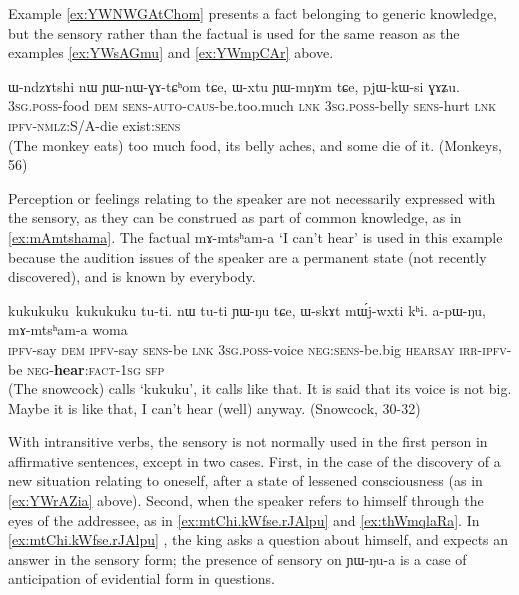 \documentclass[oldfontcommands,oneside,a4paper,11pt]{article}
\newcommand{\ipa}[1]{{\phon \mbox{#1}}} %
\begin{document}
Example \ref{ex:YWNWGAtChom} presents a fact belonging to generic knowledge, but the sensory rather than the factual is used for the same reason as the examples \ref{ex:YWsAGmu} and \ref{ex:YWmpCAr} above.

\begin{exe}
\ex \label{ex:YWNWGAtChom}
\gll
\ipa{ɯ-ndzɤtshi}  	\ipa{nɯ}  	\ipa{ɲɯ-nɯ-ɣɤ-tɕʰom}  	\ipa{tɕe,}  	\ipa{ɯ-xtu}  	\ipa{ɲɯ-mŋɤm}  	\ipa{tɕe,}  	\ipa{pjɯ-kɯ-si}  	\ipa{ɣɤʑu.}  \\
\textsc{3sg.poss}-food \textsc{dem} \textsc{sens-auto-caus}-be.too.much \textsc{lnk} \textsc{3sg.poss}-belly \textsc{sens}-hurt \textsc{lnk} \textsc{ipfv-nmlz}:S/A-die exist:\textsc{sens} \\
\glt (The monkey eats) too much food, its belly aches, and some die of it. (Monkeys, 56)
\end{exe}
  
Perception or feelings relating to the speaker are not necessarily expressed with the sensory, as they can be construed as part of common knowledge, as in \ref{ex:mAmtshama}. The factual  \ipa{mɤ-mtsʰam-a} `I can't hear' is used in this example because the audition issues of the speaker are a permanent state (not recently discovered), and is known by everybody.

\begin{exe}
\ex \label{ex:mAmtshama}
\gll
\ipa{kukukuku kukukuku} 	\ipa{tu-ti.} 	\ipa{nɯ} 	\ipa{tu-ti} 	\ipa{ɲɯ-ŋu} 	\ipa{tɕe,} 	\ipa{ɯ-skɤt} 	\ipa{mɯ́j-wxti} 	\ipa{kʰi.} 	\ipa{a-pɯ-ŋu,} \ipa{mɤ-mtsʰam-a} 	\ipa{woma} \\
{ } \textsc{ipfv}-say \textsc{dem}  \textsc{ipfv}-say \textsc{sens}-be \textsc{lnk}  \textsc{3sg.poss}-voice \textsc{neg:sens}-be.big \textsc{hearsay} \textsc{irr-ipfv}-be \textsc{neg}-\textbf{hear}:\textsc{fact-1sg} \textsc{sfp} \\
\glt (The snowcock) calls `kukuku', it calls like that. It is said that its voice is not big. Maybe it is like that, I can't hear (well) anyway. (Snowcock, 30-32)
\end{exe}

 With intransitive verbs, the sensory is not normally used in the first person in affirmative sentences, except in two cases. First, in the case of the discovery of a new situation relating to oneself, after a state of lessened consciousness (as in \ref{ex:YWrAZia} above). Second, when the speaker refers to himself through the eyes of the addressee, as in \ref{ex:mtChi.kWfse.rJAlpu} and \ref{ex:thWmqlaRa}. In \ref{ex:mtChi.kWfse.rJAlpu} , the king asks a question about himself, and expects an answer in the sensory form; the presence of sensory on \ipa{ɲɯ-ŋu-a} is a case of anticipation of evidential form in questions.
\end{document}
